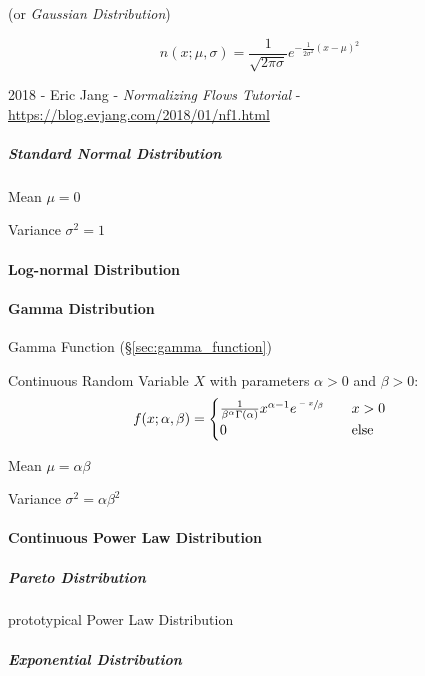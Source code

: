 (or \emph{Gaussian Distribution})

\[
  n (x; \mu, \sigma) =
  \frac{1}{\sqrt{2\pi \sigma}} e^{-\frac{1}{2 \sigma^2}(x - \mu)^2}
\]

2018 - Eric Jang
- \emph{Normalizing Flows Tutorial}
- \url{https://blog.evjang.com/2018/01/nf1.html}



\subparagraph{Standard Normal Distribution}\label{sec:standard_normal}\hfill

Mean $\mu = 0$

Variance $\sigma^2 = 1$



\paragraph{Log-normal Distribution}\label{sec:lognormal_distribution}\hfill

\paragraph{Gamma Distribution}\label{sec:gamma_distribution}\hfill

Gamma Function (\S\ref{sec:gamma_function})

Continuous Random Variable $X$ with parameters $\alpha > 0$ and $\beta
> 0$:
\[
  f(x; \alpha, \beta) =
  \begin{cases}
  \frac{1}{\beta^\alpha \Gamma(\alpha)} x^{\alpha-1} e^{\sfrac{-x}{\beta}}     & \quad x > 0 \\
  0     & \quad\text{else} \\
  \end{cases}
\]

Mean $\mu = \alpha \beta$

Variance $\sigma^2 = \alpha \beta^2$



\paragraph{Continuous Power Law Distribution}
\label{sec:continuous_power_law_distribution}\hfill

\subparagraph{Pareto Distribution}\label{sec:pareto_distribution}\hfill

prototypical Power Law Distribution



\subparagraph{Exponential Distribution}\label{sec:exponential_squared}\hfill

